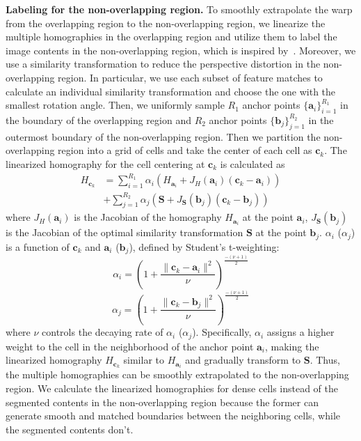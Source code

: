 \documentclass[10pt,twocolumn,letterpaper]{article}
\begin{document}
\noindent\textbf{Labeling for the non-overlapping region.}
To smoothly extrapolate the warp
from the overlapping region to the non-overlapping region,
we linearize the multiple homographies in the overlapping region and utilize them to label the image contents in the non-overlapping region, which is inspired by~\cite{lin2015adaptive}. Moreover, we use a similarity transformation to reduce the perspective distortion in the non-overlapping region. 
In particular, we use each subset of feature matches to calculate an individual similarity transformation and choose the one with the smallest rotation angle. Then, we  uniformly sample $R_1$ anchor points $\{\mathbf{a}_i\}_{i=1}^{R_1}$ in the boundary of the overlapping region and $R_2$ anchor points $\{\mathbf{b}_j\}_{j=1}^{R_2}$ in the outermost boundary of the non-overlapping region. Then we partition the non-overlapping region into a grid of cells and take the center of each cell as $\mathbf{c}_k$. The linearized homography for the cell centering at $\mathbf{c}_k$ is calculated as
\begin{align}
	H_{\mathbf{c}_k} & = \sum_{i=1}^{R_1} \alpha_i \left(H_{\mathbf{a}_i} + J_H(\mathbf{a}_i)(\mathbf{c}_k-\mathbf{a}_i)\right)\nonumber\\
	& + \sum_{j=1}^{R_2} \alpha_j \left(\mathbf{S} + J_\mathbf{S}(\mathbf{b}_j)(\mathbf{c}_k-\mathbf{b}_j)\right)
	\label{eq:nonoverlapping}
\end{align}
where $J_H(\mathbf{a}_i)$ is the Jacobian of the homography $H_{\mathbf{a}_i}$ at the point $\mathbf{a}_i$, $J_\mathbf{S}(\mathbf{b}_j)$ is the Jacobian of the optimal similarity transformation $\mathbf{S}$ at the point $\mathbf{b}_j$. $\alpha_i$ ($\alpha_j$) is a function of $\mathbf{c}_k$ and $\mathbf{a}_i$ ($\mathbf{b}_j$), defined by Student's t-weighting:
\begin{equation}
	\alpha_i = \left(1+\frac{\|\mathbf{c}_k-\mathbf{a}_i\|^2}{\nu}\right)^{\frac{-(\nu+1)}{2}}
\end{equation}	
\begin{equation}	
	\alpha_j = \left(1+\frac{\|\mathbf{c}_k-\mathbf{b}_j\|^2}{\nu}\right)^{\frac{-(\nu+1)}{2}}
\end{equation}
where $\nu$ controls the decaying rate of $\alpha_i$ ($\alpha_j$). Specifically, $\alpha_i$ assigns a higher weight to the cell in the neighborhood of the anchor point $\mathbf{a}_i$, making the linearized homography $H_{\mathbf{c}_k}$ similar to $H_{\mathbf{a}_i}$ and gradually transform to $\mathbf{S}$. Thus, the multiple homographies can be smoothly extrapolated to the non-overlapping region. We calculate the linearized homographies for dense cells instead of the segmented contents in the non-overlapping region because the former can generate smooth and matched boundaries between the neighboring cells, while the segmented contents don't.
\end{document}

